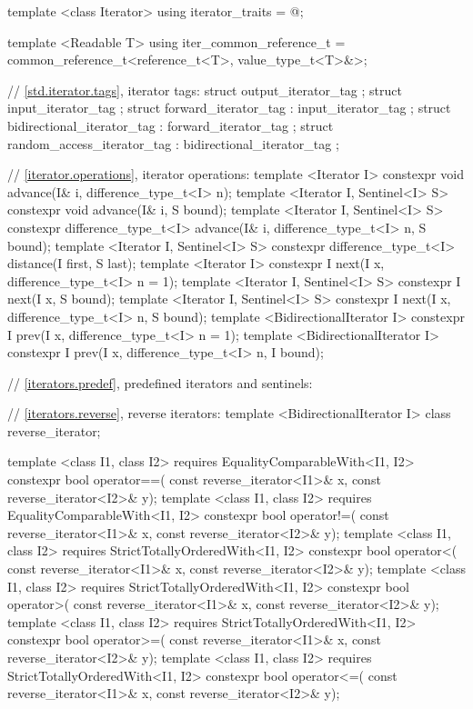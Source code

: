 \begin{codeblock}
{{{{  template <class Iterator> using iterator_traits = @\seebelow@;

  template <Readable T> using iter_common_reference_t
    = common_reference_t<reference_t<T>, value_type_t<T>&>;

  // \ref{std.iterator.tags}, iterator tags:
  struct output_iterator_tag { };
  struct input_iterator_tag { };
  struct forward_iterator_tag : input_iterator_tag { };
  struct bidirectional_iterator_tag : forward_iterator_tag { };
  struct random_access_iterator_tag : bidirectional_iterator_tag { };

  // \ref{iterator.operations}, iterator operations:
  template <Iterator I>
    constexpr void advance(I& i, difference_type_t<I> n);
  template <Iterator I, Sentinel<I> S>
    constexpr void advance(I& i, S bound);
  template <Iterator I, Sentinel<I> S>
    constexpr difference_type_t<I> advance(I& i, difference_type_t<I> n, S bound);
  template <Iterator I, Sentinel<I> S>
    constexpr difference_type_t<I> distance(I first, S last);
  template <Iterator I>
    constexpr I next(I x, difference_type_t<I> n = 1);
  template <Iterator I, Sentinel<I> S>
    constexpr I next(I x, S bound);
  template <Iterator I, Sentinel<I> S>
    constexpr I next(I x, difference_type_t<I> n, S bound);
  template <BidirectionalIterator I>
    constexpr I prev(I x, difference_type_t<I> n = 1);
  template <BidirectionalIterator I>
    constexpr I prev(I x, difference_type_t<I> n, I bound);

  // \ref{iterators.predef}, predefined iterators and sentinels:

  // \ref{iterators.reverse}, reverse iterators:
  template <BidirectionalIterator I> class reverse_iterator;

  template <class I1, class I2>
      requires EqualityComparableWith<I1, I2>
    constexpr bool operator==(
      const reverse_iterator<I1>& x,
      const reverse_iterator<I2>& y);
  template <class I1, class I2>
      requires EqualityComparableWith<I1, I2>
    constexpr bool operator!=(
      const reverse_iterator<I1>& x,
      const reverse_iterator<I2>& y);
  template <class I1, class I2>
      requires StrictTotallyOrderedWith<I1, I2>
    constexpr bool operator<(
      const reverse_iterator<I1>& x,
      const reverse_iterator<I2>& y);
  template <class I1, class I2>
      requires StrictTotallyOrderedWith<I1, I2>
    constexpr bool operator>(
      const reverse_iterator<I1>& x,
      const reverse_iterator<I2>& y);
  template <class I1, class I2>
      requires StrictTotallyOrderedWith<I1, I2>
    constexpr bool operator>=(
      const reverse_iterator<I1>& x,
      const reverse_iterator<I2>& y);
  template <class I1, class I2>
      requires StrictTotallyOrderedWith<I1, I2>
    constexpr bool operator<=(
      const reverse_iterator<I1>& x,
      const reverse_iterator<I2>& y);

}}}}
\end{codeblock}
